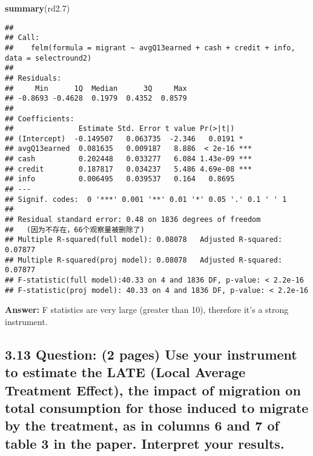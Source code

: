 \documentclass[
]{article}
\newenvironment{Shaded}{\begin{snugshade}}{\end{snugshade}}
\newcommand{\FloatTok}[1]{\textcolor[rgb]{0.00,0.00,0.81}{#1}}
\newcommand{\FunctionTok}[1]{\textcolor[rgb]{0.13,0.29,0.53}{\textbf{#1}}}
\newcommand{\NormalTok}[1]{#1}
\begin{document}
\begin{Shaded}
\begin{Highlighting}[]
\FunctionTok{summary}\NormalTok{(rd2}\FloatTok{.7}\NormalTok{)}
\end{Highlighting}
\end{Shaded}

\begin{verbatim}
## 
## Call:
##    felm(formula = migrant ~ avgQ13earned + cash + credit + info,      data = selectround2) 
## 
## Residuals:
##     Min      1Q  Median      3Q     Max 
## -0.8693 -0.4628  0.1979  0.4352  0.8579 
## 
## Coefficients:
##               Estimate Std. Error t value Pr(>|t|)    
## (Intercept)  -0.149507   0.063735  -2.346   0.0191 *  
## avgQ13earned  0.081635   0.009187   8.886  < 2e-16 ***
## cash          0.202448   0.033277   6.084 1.43e-09 ***
## credit        0.187817   0.034237   5.486 4.69e-08 ***
## info          0.006495   0.039537   0.164   0.8695    
## ---
## Signif. codes:  0 '***' 0.001 '**' 0.01 '*' 0.05 '.' 0.1 ' ' 1
## 
## Residual standard error: 0.48 on 1836 degrees of freedom
##   (因为不存在，66个观察量被删除了)
## Multiple R-squared(full model): 0.08078   Adjusted R-squared: 0.07877 
## Multiple R-squared(proj model): 0.08078   Adjusted R-squared: 0.07877 
## F-statistic(full model):40.33 on 4 and 1836 DF, p-value: < 2.2e-16 
## F-statistic(proj model): 40.33 on 4 and 1836 DF, p-value: < 2.2e-16
\end{verbatim}

\textbf{Answer:} F statistics are very large (greater than 10),
therefore it's a strong instrument.

\clearpage

\hypertarget{question-2-pages-use-your-instrument-to-estimate-the-late-local-average-treatment-effect-the-impact-of-migration-on-total-consumption-for-those-induced-to-migrate-by-the-treatment-as-in-columns-6-and-7-of-table-3-in-the-paper.-interpret-your-results.}{%
\subsection{\texorpdfstring{3.13 \textbf{Question: (2 pages) Use your
instrument to estimate the LATE (Local Average Treatment Effect), the
impact of migration on total consumption for those induced to migrate by
the treatment, as in columns 6 and 7 of table 3 in the paper. Interpret
your results.
}}{3.13 Question: (2 pages) Use your instrument to estimate the LATE (Local Average Treatment Effect), the impact of migration on total consumption for those induced to migrate by the treatment, as in columns 6 and 7 of table 3 in the paper. Interpret your results. }}\label{question-2-pages-use-your-instrument-to-estimate-the-late-local-average-treatment-effect-the-impact-of-migration-on-total-consumption-for-those-induced-to-migrate-by-the-treatment-as-in-columns-6-and-7-of-table-3-in-the-paper.-interpret-your-results.}}
\end{document}
